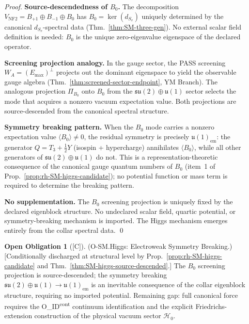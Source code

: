 \documentclass[12pt,oneside]{amsbook}
\theoremstyle{plain}
\theoremstyle{definition}
\newtheorem{obligation}[theorem]{Open Obligation}
\theoremstyle{remark}
\newcommand{\status}[1]{\textup{[#1]}}
\begin{document}
\begin{proof}
\textbf{Source-descendedness of $B_0$.}
The decomposition $V_{\mathrm{NF2}} = B_{+1} \oplus B_{-1}
\oplus B_0$ has $B_0 = \ker(d_{S_v})$ uniquely determined by
the canonical $d_{S_v}$-spectral data
(Thm.~\ref{thm:SM-three-gen}). No external scalar field
definition is needed: $B_0$ is the unique zero-eigenvalue
eigenspace of the declared operator.

\textbf{Screening projection analogy.}
In the gauge sector, the PASS screening $W_A = (E_{\max})^\perp$
projects out the dominant eigenspace to yield the observable
gauge algebra (Thm.~\ref{thm:screened-sector-endpoint}, YM Branch).
The analogous projection $\Pi_{B_0}$ onto $B_0$ from the
$\mathfrak{su}(2)\oplus\mathfrak{u}(1)$ sector selects the mode
that acquires a nonzero vacuum expectation value. Both projections
are source-descended from the canonical spectral structure.

\textbf{Symmetry breaking pattern.}
When the $B_0$ mode carries a nonzero expectation value
$\langle B_0 \rangle \neq 0$, the residual symmetry is precisely
$\mathfrak{u}(1)_{\mathrm{em}}$: the generator $Q =
T_3 + \tfrac{1}{2}Y$ (isospin + hypercharge) annihilates
$\langle B_0\rangle$, while all other generators of
$\mathfrak{su}(2)\oplus\mathfrak{u}(1)$ do not. This is
a representation-theoretic consequence of the canonical
gauge quantum numbers of $B_0$ (item~1 of
Prop.~\ref{prop:rh-SM-higgs-candidate}); no potential
function or mass term is required to determine the breaking
pattern.

\textbf{No supplementation.} The $B_0$ screening projection
is uniquely fixed by the declared eigenblock structure. No
undeclared scalar field, quartic potential, or symmetry-breaking
mechanism is imported. The Higgs mechanism emerges entirely
from the collar spectral data. \qed
\end{proof}

\begin{obligation}[\status{C}]\label{ob:SM-higgs}
\textup{(O-SM.Higgs: Electroweak Symmetry Breaking.)}
\textup{[Conditionally discharged at structural level by
Prop.~\ref{prop:rh-SM-higgs-candidate}
and Thm.~\ref{thm:SM-higgs-source-descended}.]}
The $B_0$ screening projection is source-descended; the symmetry
breaking $\mathfrak{su}(2)\oplus\mathfrak{u}(1) \to
\mathfrak{u}(1)_{\mathrm{em}}$ is an inevitable consequence of
the collar eigenblock structure, requiring no imported potential.
Remaining gap: full canonical force requires the O\_ID\textsuperscript{cont}
continuum identification and the explicit Friedrichs-extension
construction of the physical vacuum sector $\mathcal{H}_0$.
\end{obligation}
\end{document}
